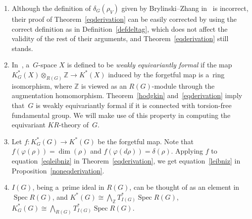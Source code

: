 \documentclass[11pt]{article}
\numberwithin{equation}{section}
\DeclareMathOperator{\Spec}{Spec}
\begin{document}
\begin{Remark}\label{weakequivformality}\quad
\begin{enumerate}\itemsep=0pt
\item
Although the def\/inition of $\delta_G(\rho_V)$ given by Brylinski--Zhang in~\cite{BZ} is incorrect, their proof of
Theorem~\ref{eqderivation} can be easily corrected by using the correct def\/inition as in Def\/inition~\ref{defdeltag},
which does not af\/fect the validity of the rest of their arguments, and Theorem~\ref{eqderivation} still stands.
\item
In~\cite{HL}, a~$G$-space $X$ is def\/ined to be \emph{weakly equivariantly formal} if the map
$K^*_G(X)\otimes_{R(G)}\mathbb{Z}\to K^*(X)$ induced by the forgetful map is a~ring isomorphism, where $\mathbb{Z}$ is
viewed as an $R(G)$-module through the augmentation homomorphism.
Theorem~\ref{hodgkin} and~\ref{eqderivation} imply that~$G$ is weakly equivariantly formal if it is connected with
torsion-free fundamental group.
We will make use of this property in computing the equivariant $KR$-theory of~$G$.
\item
Let $f: K_G^*(G)\to K^*(G)$ be the forgetful map.
Note that $f(\varphi(\rho))=\dim(\rho)$ and $f(\varphi(d\rho))=\delta(\rho)$.
Applying $f$ to equation~\eqref{eqleibniz} in Theorem~\ref{eqderivation}, we get equation~\eqref{leibniz} in
Proposition~\ref{noneqderivation}.
\item
$I(G)$, being a~prime ideal in $R(G)$, can be thought of as an element in $\Spec R(G)$, and
$K^*(G)\cong\bigwedge_{\mathbb{Z}}T^*_{I(G)}\Spec R(G)$, $K_G^*(G)\cong\bigwedge_{R(G)}T^*_{I(G)}\Spec R(G)$.
\end{enumerate}
\end{Remark}
\end{document}
